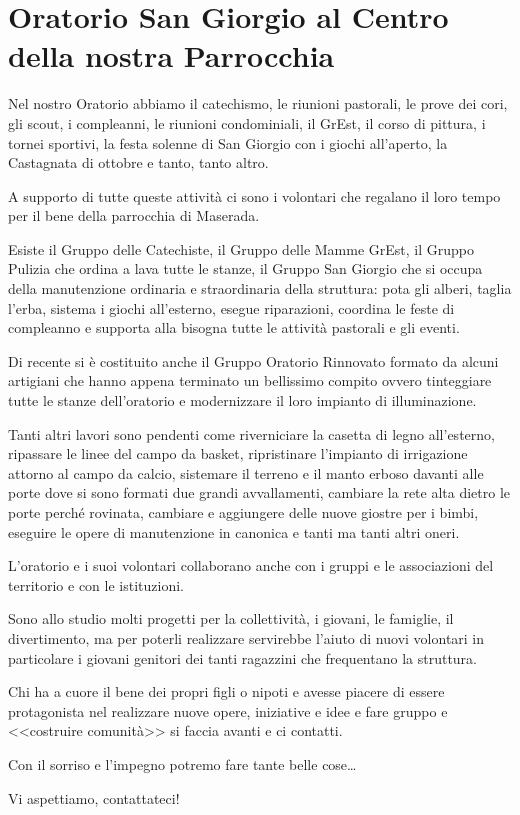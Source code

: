 \section{Oratorio San Giorgio al Centro della nostra Parrocchia}

Nel nostro Oratorio abbiamo il catechismo, le riunioni pastorali, le prove dei cori, gli scout, i compleanni, le riunioni condominiali, il GrEst, il corso di pittura, i tornei sportivi, la festa solenne di San Giorgio con i giochi all'aperto, la Castagnata di ottobre e tanto, tanto altro.

A supporto di tutte queste attività ci sono i volontari che regalano il loro tempo per il bene della parrocchia di Maserada.

Esiste il Gruppo delle Catechiste, il Gruppo delle Mamme GrEst, il Gruppo Pulizia che ordina a lava tutte le stanze, il Gruppo San Giorgio che si occupa della manutenzione ordinaria e straordinaria della struttura: pota gli alberi, taglia l'erba, sistema i giochi all'esterno, esegue riparazioni, coordina le feste di compleanno e supporta alla bisogna tutte le attività pastorali e gli eventi.

Di recente si è costituito anche il Gruppo Oratorio Rinnovato formato da alcuni artigiani che hanno appena terminato un bellissimo compito ovvero tinteggiare tutte le stanze dell'oratorio e modernizzare il loro impianto di illuminazione.

Tanti altri lavori sono pendenti come riverniciare la casetta di legno all'esterno, ripassare le linee del campo da basket, ripristinare l'impianto di irrigazione attorno al campo da calcio, sistemare il terreno e il manto erboso davanti alle porte dove si sono formati due grandi avvallamenti, cambiare la rete alta dietro le porte perché rovinata, cambiare e aggiungere delle nuove giostre per i bimbi, eseguire le opere di manutenzione in canonica e tanti ma tanti altri oneri.

L'oratorio e i suoi volontari collaborano anche con i gruppi e le associazioni del territorio e con le istituzioni.

Sono allo studio molti progetti per la collettività, i giovani, le famiglie, il divertimento, ma per poterli realizzare servirebbe l'aiuto di nuovi volontari in particolare i giovani genitori dei tanti ragazzini che frequentano la struttura.

Chi ha a cuore il bene dei propri figli o nipoti e avesse piacere di essere protagonista nel realizzare nuove opere, iniziative e idee e fare gruppo e <<costruire comunità>> si faccia avanti e ci contatti.

Con il sorriso e l'impegno potremo fare tante belle cose\ldots

Vi aspettiamo, contattateci!

